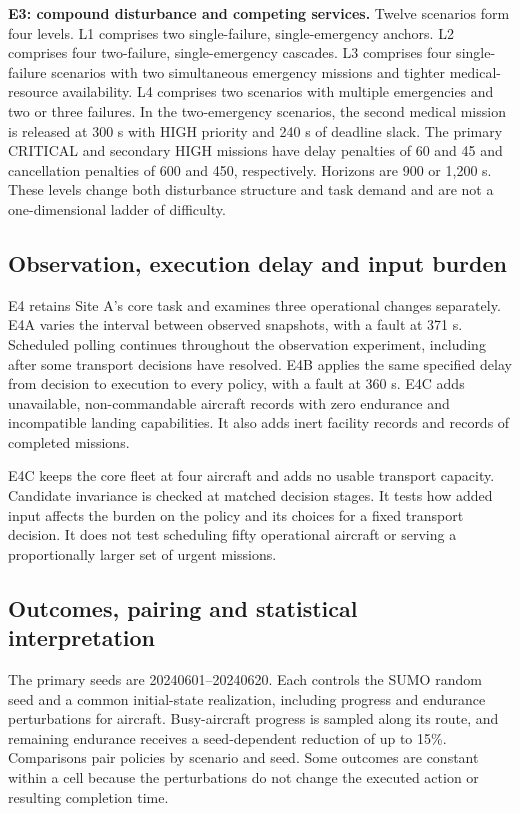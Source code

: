 \documentclass[]{interact}
\theoremstyle{plain}
\theoremstyle{definition}
\theoremstyle{remark}
\begin{document}
\textbf{E3: compound disturbance and competing services.} Twelve scenarios form four levels. L1 comprises two single-failure, single-emergency anchors. L2 comprises four two-failure, single-emergency cascades. L3 comprises four single-failure scenarios with two simultaneous emergency missions and tighter medical-resource availability. L4 comprises two scenarios with multiple emergencies and two or three failures. In the two-emergency scenarios, the second medical mission is released at 300 s with HIGH priority and 240 s of deadline slack. The primary CRITICAL and secondary HIGH missions have delay penalties of 60 and 45 and cancellation penalties of 600 and 450, respectively. Horizons are 900 or 1,200 s. These levels change both disturbance structure and task demand and are not a one-dimensional ladder of difficulty.

\subsection{Observation, execution delay and input burden}

E4 retains Site A's core task and examines three operational changes separately. E4A varies the interval between observed snapshots, with a fault at 371 s. Scheduled polling continues throughout the observation experiment, including after some transport decisions have resolved. E4B applies the same specified delay from decision to execution to every policy, with a fault at 360 s. E4C adds unavailable, non-commandable aircraft records with zero endurance and incompatible landing capabilities. It also adds inert facility records and records of completed missions.

E4C keeps the core fleet at four aircraft and adds no usable transport capacity. Candidate invariance is checked at matched decision stages. It tests how added input affects the burden on the policy and its choices for a fixed transport decision. It does not test scheduling fifty operational aircraft or serving a proportionally larger set of urgent missions.

\subsection{Outcomes, pairing and statistical interpretation}

The primary seeds are 20240601--20240620. Each controls the SUMO random seed and a common initial-state realization, including progress and endurance perturbations for aircraft. Busy-aircraft progress is sampled along its route, and remaining endurance receives a seed-dependent reduction of up to 15\%. Comparisons pair policies by scenario and seed. Some outcomes are constant within a cell because the perturbations do not change the executed action or resulting completion time.
\end{document}
